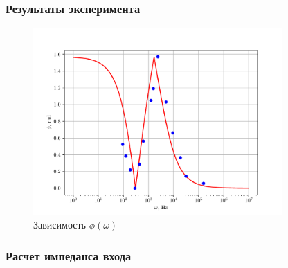 \subsubsection{Результаты эксперимента}
% 
\begin{figure}[H]
	\centering
	\includegraphics[width=0.85\textwidth]{img/Figure_6}
	\caption{Зависимость $\phi(\omega)$}
	\label{fig:phaserot_phi_R}
\end{figure}


\subsubsection{Расчет импеданса входа}

